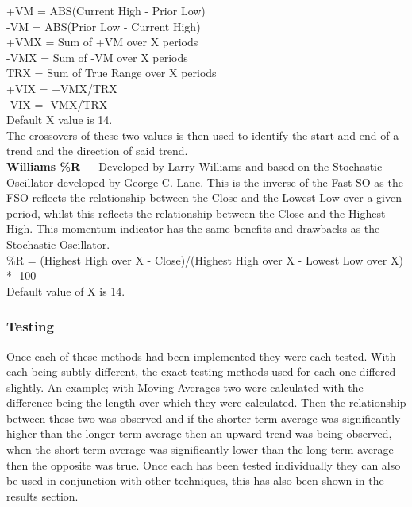 \documentclass[12pt,a4paper]{article}
\begin{document}
\noindent
+VM = ABS(Current High - Prior Low)\\
-VM = ABS(Prior Low - Current High)\\

\noindent
+VMX = Sum of +VM over X periods \\
-VMX = Sum of -VM over X periods \\

\noindent
TRX = Sum of True Range over X periods \\

\noindent
+VIX = +VMX/TRX \\
-VIX = -VMX/TRX \\

\noindent
Default X value is 14.\\

\noindent
The crossovers of these two values is then used to identify the start and end of a trend and the direction of said trend.\\

\iffalse
[]
\fi

\noindent
\textbf{Williams \%R} - \cite{Murphy1999} - Developed by Larry Williams and based on the Stochastic Oscillator developed by George C. Lane. This is the inverse of the Fast SO as the FSO reflects the relationship between the Close and the Lowest Low over a given period, whilst this reflects the relationship between the Close and the Highest High. This momentum indicator has the same benefits and drawbacks as the Stochastic Oscillator.\\

\noindent
\%R = (Highest High over X - Close)/(Highest High over X - Lowest Low over X) * -100\\
Default value of X is 14.

\iffalse
[]
\fi

\iffalse
#################################################################################
\fi

\subsubsection*{Testing}

Once each of these methods had been implemented they were each tested. With each being subtly different, the exact testing methods used for each one differed slightly. An example; with Moving Averages two were calculated with the difference being the length over which they were calculated. Then the relationship between these two was observed and if the shorter term average was significantly higher than the longer term average then an upward trend was being observed, when the short term average was significantly lower than the long term average then the opposite was true. Once each has been tested individually they can also be used in conjunction with other techniques, this has also been shown in the results section. \\
\end{document}
